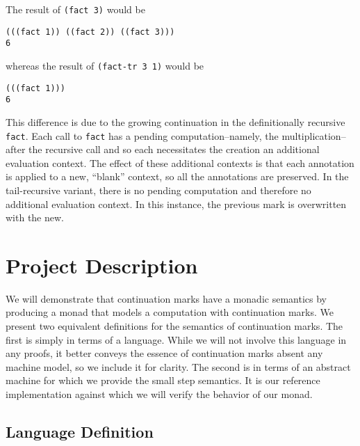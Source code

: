 \documentclass[ms]{byuprop}
\newcounter{definition}
\begin{document}
The result of \texttt{(fact 3)} would be

\begin{verbatim}
(((fact 1)) ((fact 2)) ((fact 3)))
6
\end{verbatim}

whereas the result of \texttt{(fact-tr 3 1)} would be

\begin{verbatim}
(((fact 1)))
6
\end{verbatim}

This difference is due to the growing continuation in the definitionally recursive
\texttt{fact}. Each call to \texttt{fact} has a pending computation--namely, the
multiplication--after the recursive call and so each necessitates the creation an
additional evaluation context. The effect of these additional contexts is that each
annotation is applied to a new, ``blank'' context, so all the annotations are preserved. In
the tail-recursive variant, there is no pending computation and therefore no additional
evaluation context. In this instance, the previous mark is overwritten with the new.




\section{Project Description}

We will demonstrate that continuation marks have a monadic semantics by producing a monad
that models a computation with continuation marks. We present two equivalent definitions 
for the semantics of continuation marks. The first is simply in terms of a language. While 
we will not involve this language in any proofs, it better conveys the essence of continuation 
marks absent any machine model, so we include it for clarity. The second is in terms of an 
abstract machine for which we provide the small step semantics. It is our reference 
implementation against which we will verify the behavior of our monad.

\subsection{Language Definition}
\end{document}
